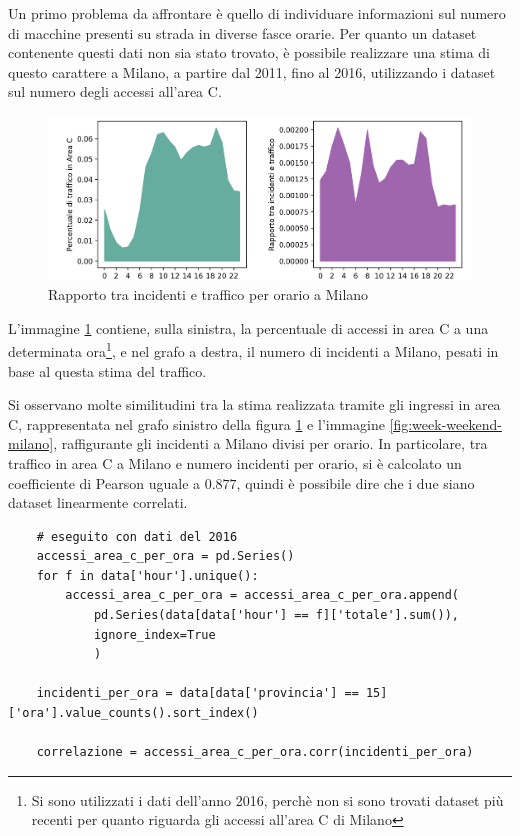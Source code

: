 \documentclass[a4paper,12pt]{report}
\begin{document}
Un primo problema da affrontare è quello di individuare informazioni sul 
numero di macchine presenti su strada in diverse fasce orarie. 
Per quanto un dataset contenente questi dati non sia stato trovato, 
è possibile realizzare una stima di questo carattere a Milano, 
a partire dal 2011, fino al 2016, utilizzando i dataset sul numero 
degli accessi all'area C.

\begin{figure}
    \includegraphics[width=\linewidth]{../src/area_c/rapporto_orario.png}
    \caption{Rapporto tra incidenti e traffico per orario a Milano}
    \label{fig:rapporto-incidenti-traffico}
\end{figure}

L'immagine \ref{fig:rapporto-incidenti-traffico} contiene, sulla sinistra, 
la percentuale di accessi in area C a una determinata 
ora\footnote{Si sono utilizzati i dati dell'anno 2016, perchè non si sono trovati 
dataset più recenti per quanto riguarda gli accessi all'area C di Milano}, 
e nel grafo a destra, il numero di incidenti a Milano, pesati in base al 
questa stima del traffico.

Si osservano molte similitudini tra la stima realizzata tramite gli ingressi 
in area C, rappresentata nel grafo sinistro della 
figura \ref{fig:rapporto-incidenti-traffico} e l'immagine \ref{fig:week-weekend-milano}, 
raffigurante gli incidenti a Milano divisi per orario. 
In particolare, tra traffico in area C a Milano e 
numero incidenti per orario, si è calcolato un coefficiente di Pearson uguale a $0.877$, 
quindi è possibile dire che i due siano dataset linearmente correlati.

\begin{lstlisting}
    # eseguito con dati del 2016
    accessi_area_c_per_ora = pd.Series()
    for f in data['hour'].unique():
        accessi_area_c_per_ora = accessi_area_c_per_ora.append(
            pd.Series(data[data['hour'] == f]['totale'].sum()), 
            ignore_index=True
            )

    incidenti_per_ora = data[data['provincia'] == 15]['ora'].value_counts().sort_index()

    correlazione = accessi_area_c_per_ora.corr(incidenti_per_ora)
\end{lstlisting}
\end{document}
